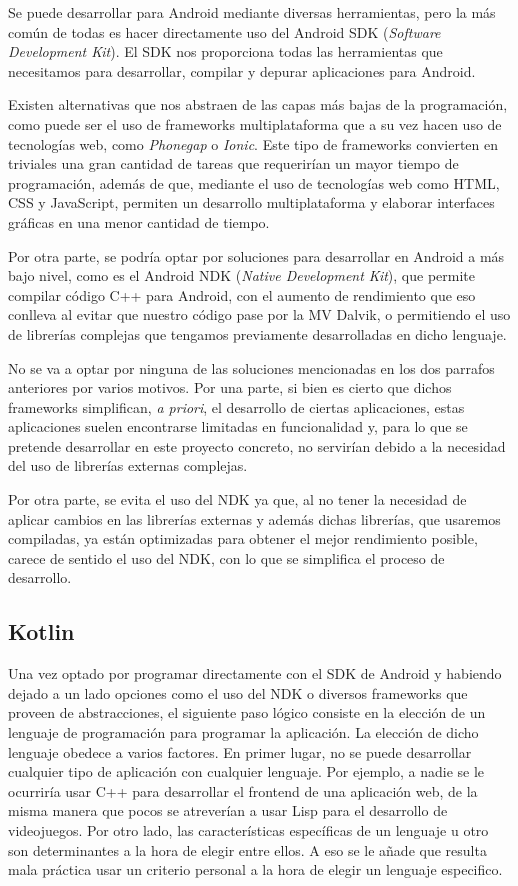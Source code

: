 Se puede desarrollar para Android mediante diversas herramientas, pero la más común de todas es hacer directamente uso del Android SDK (\textit{Software Development Kit}). El SDK nos proporciona todas las herramientas que necesitamos para desarrollar, compilar y depurar aplicaciones para Android.

Existen alternativas que nos abstraen de las capas más bajas de la programación, como puede ser el uso de frameworks multiplataforma que a su vez hacen uso de tecnologías web, como \textit{Phonegap} o \textit{Ionic}. Este tipo de frameworks convierten en triviales una gran cantidad de tareas que requerirían un mayor tiempo de programación, además de que, mediante el uso de tecnologías web como HTML, CSS y JavaScript, permiten un desarrollo multiplataforma y elaborar interfaces gráficas en una menor cantidad de tiempo.

Por otra parte, se podría optar por soluciones para desarrollar en Android a más bajo nivel, como es el Android NDK (\textit{Native Development Kit}), que permite compilar código C++ para Android, con el aumento de rendimiento que eso conlleva al evitar que nuestro código pase por la MV Dalvik, o permitiendo el uso de librerías complejas que tengamos previamente desarrolladas en dicho lenguaje.

No se va a optar por ninguna de las soluciones mencionadas en los dos parrafos anteriores por varios motivos. Por una parte, si bien es cierto que dichos frameworks simplifican, \textit{a priori}, el desarrollo de ciertas aplicaciones, estas aplicaciones suelen encontrarse limitadas en funcionalidad y, para lo que se pretende desarrollar en este proyecto concreto, no servirían debido a la necesidad del uso de librerías externas complejas.

Por otra parte, se evita el uso del NDK ya que, al no tener la necesidad de aplicar cambios en las librerías externas y además dichas librerías, que usaremos compiladas, ya están optimizadas para obtener el mejor rendimiento posible, carece de sentido el uso del NDK, con lo que se simplifica el proceso de desarrollo.

\subsection{Kotlin}

Una vez optado por programar directamente con el SDK de Android y habiendo dejado a un lado opciones como el uso del NDK o diversos frameworks que proveen de abstracciones, el siguiente paso lógico consiste en la elección de un lenguaje de programación para programar la aplicación. La elección de dicho lenguaje obedece a varios factores. En primer lugar, no se puede desarrollar cualquier tipo de aplicación con cualquier lenguaje. Por ejemplo, a nadie se le ocurriría usar C++ para desarrollar el frontend de una aplicación web, de la misma manera que pocos se atreverían a usar Lisp para el desarrollo de videojuegos. Por otro lado, las características específicas de un lenguaje u otro son determinantes a la hora de elegir entre ellos. A eso se le añade que resulta mala práctica usar un criterio personal a la hora de elegir un lenguaje especifico.

